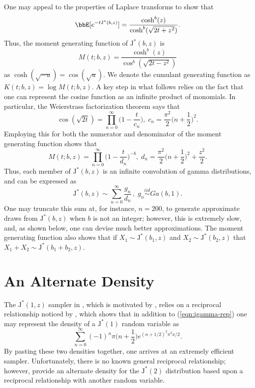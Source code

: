\documentclass[12pt]{article}
\newcommand{\JJ}{\text{J}^*}
\newcommand{\simiid}{\stackrel{iid}{\sim}}
\begin{document}
One may appeal to the properties of Laplace transforms to show that
\[
\bbE[ e^{-t \JJ(b,z)} ] = \frac{\cosh^b(z)}{\cosh^b(\sqrt{2t + z^2})}.
\]
Thus, the moment generating function of $\JJ(b,z)$ is
\[
M(t; b,z) = \frac{\cosh^b(z)}{\cos^{b}(\sqrt{2t - z^2})}
\]
as $\cosh(\sqrt{-u}) = \cos(\sqrt{u})$.  We denote the cumulant generating
function as $K(t; b,z) = \log M(t; b,z)$.  A key step in what follows relies on
the fact that one can represent the cosine function as an infinite product of
monomials.  In particular, the Weierstrass factorization theorem says that
\[
\cos(\sqrt{2t}) = \prod_{n=0}^\infty \Big( 1 - \frac{t}{c_n} \Big), \; 
  c_n = \frac{\pi^2}{2} \Big( n + \frac{1}{2} \Big)^2.
\]
Employing this for both the numerator and denominator of the moment generating
function shows that
\[
M(t; b, z) = \prod_{n=0}^\infty \Big( 1 - \frac{t}{d_n} \Big)^{-b}, \; 
  d_n = \frac{\pi^2}{2} \Big( n + \frac{1}{2} \Big)^2 + \frac{z^2}{2}.
\]
Thus, each member of $\JJ(b,z)$ is an infinite convolution of gamma
distributions, and can be expressed as
\[
\JJ(b,z) \sim \sum_{n=0}^\infty \frac{g_n}{d_n} \, , \; g_n \simiid Ga(b,1).
\]
One may truncate this sum at, for instance, $n=200$, to generate approximate
draws from $\JJ(b,z)$ when $b$ is not an integer; however, this is extremely
slow, and, as shown below, one can devise much better approximations.  The
moment generating function also shows that if $X_1 \sim \JJ(b_1,z)$ and $X_2
\sim \JJ(b_2, z)$ that $X_1 + X_2 \sim \JJ(b_1 + b_2, z)$.

\section{An Alternate Density}
\label{sec:alternate-density}

The $\JJ(1,z)$ sampler in \cite{polson-etal-2013}, which is motivated by
\cite{devroye-2009}, relies on a reciprocal relationship noticed by
\cite{ciesielski-taylor-1962}, which shows that in addition to
(\ref{eqn:igamma-rep}) one may represent the density of a $\JJ(1)$ random
variable as
\[
\sum_{n=0}^\infty (-1)^n \pi \Big(n+\frac{1}{2}\Big) e^{(n+1/2)^2 \pi^2 x / 2}.
\]
By pasting these two densities together, one arrives at an extremely efficient
sampler.  Unfortunately, there is no known general reciprocal relationship;
however, \cite{biane-etal-2001} provide an alternate density for the $\JJ(2)$
distribution based upon a reciprocal relationship with another random variable.
\end{document}
